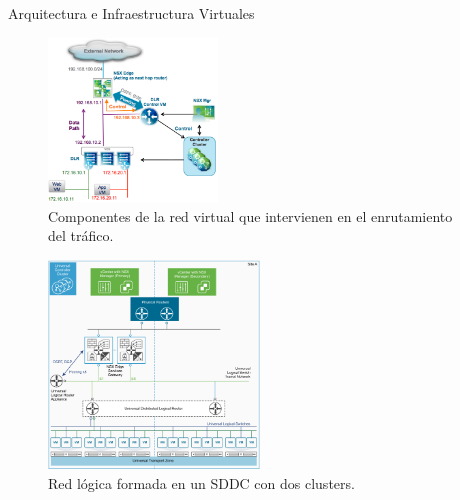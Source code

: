 \begin{subsection}{Arquitectura e Infraestructura Virtuales\cite{CFVirtInfraes}}
 \begin{figure}[h!]
  \centering
  \includegraphics[width=0.4\textwidth]{imaxes/conceptosPrevios/LogicalRoutingComponents.png}
  \caption{Componentes de la red virtual que intervienen en el enrutamiento del tráfico.}
  \label{fig:logicalRoutingCompo}
\end{figure}
\FloatBarrier

\begin{figure}[h!]
  \centering
  \includegraphics[width=0.5\textwidth]{imaxes/conceptosPrevios/redlogCF.png}
  \caption{Red lógica formada en un SDDC con dos clusters.}
  \label{fig:redLogicaOne}
\end{figure}
\FloatBarrier
 

\end{subsection}
